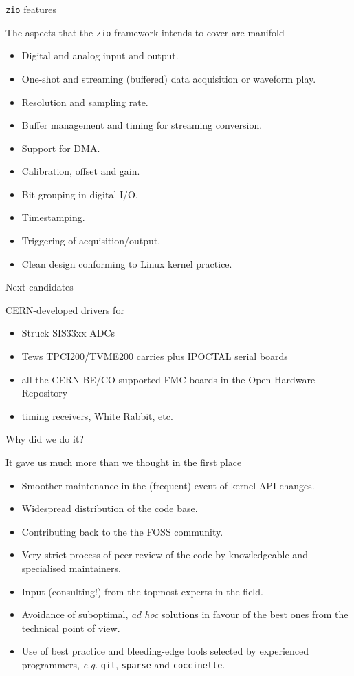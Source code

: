 \documentclass{beamer}
\begin{document}
\begin{frame}{\texttt{zio} features}

The aspects that the \texttt{zio} framework intends to cover are
manifold
\begin{itemize} \small
\item Digital and analog input and output.
\item One-shot and streaming (buffered) data acquisition or waveform play.
\item Resolution and sampling rate.
\item Buffer management and timing for streaming conversion.
\item Support for DMA.
\item Calibration, offset and gain.
\item Bit grouping in digital I/O.
\item Timestamping.
\item Triggering of acquisition/output.
\item Clean design conforming to Linux kernel practice.
\end{itemize}
\end{frame}

\begin{frame}{Next candidates}

CERN-developed drivers for
\begin{itemize}
\item Struck SIS33xx ADCs
\item Tews TPCI200/TVME200 carries plus IPOCTAL serial boards
\item all the CERN BE/CO-supported FMC boards in the Open Hardware Repository
\item timing receivers, White Rabbit, etc.
\end{itemize}
\end{frame}

\begin{frame}{Why did we do it?}

It gave us much more than we thought in the first place
\begin{itemize}
\item Smoother maintenance in the (frequent) event of kernel API
  changes.
\item Widespread distribution of the code base.
\item Contributing back to the the FOSS community.
\item Very strict process of peer review of the code by knowledgeable
    and specialised maintainers.
\item Input (consulting!) from the topmost experts in the field.
\item Avoidance of suboptimal, \emph{ad hoc} solutions in favour of the
    best ones from the technical point of view.
\item Use of best practice and bleeding-edge tools selected by
    experienced programmers, \emph{e.g.} \texttt{git}, \texttt{sparse}
    and \texttt{coccinelle}.
\end{itemize}
\end{frame}
\end{document}

